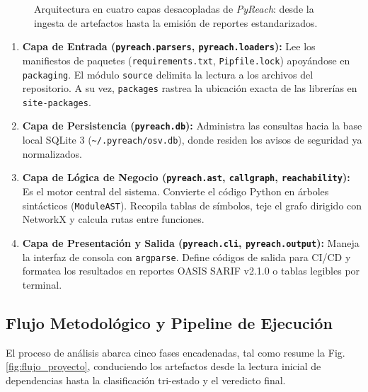 \documentclass[conference]{IEEEtran}
\begin{document}
\begin{figure}[!htbp]
{
}
\caption{Arquitectura en cuatro capas desacopladas de \textit{PyReach}: desde la ingesta de artefactos hasta la emisión de reportes estandarizados.}
\label{fig:arquitectura_capas}
\end{figure}

\begin{enumerate}
    \item \textbf{Capa de Entrada (\texttt{pyreach.parsers}, \texttt{pyreach.loaders}):} Lee los manifiestos de paquetes (\texttt{requirements.txt}, \texttt{Pipfile.lock}) apoyándose en \texttt{packaging}. El módulo \texttt{source} delimita la lectura a los archivos del repositorio. A su vez, \texttt{packages} rastrea la ubicación exacta de las librerías en \texttt{site-packages}.
    \item \textbf{Capa de Persistencia (\texttt{pyreach.db}):} Administra las consultas hacia la base local SQLite 3 (\texttt{\~{}/.pyreach/osv.db}), donde residen los avisos de seguridad ya normalizados.
    \item \textbf{Capa de Lógica de Negocio (\texttt{pyreach.ast}, \texttt{callgraph}, \texttt{reachability}):} Es el motor central del sistema. Convierte el código Python en árboles sintácticos (\texttt{ModuleAST}). Recopila tablas de símbolos, teje el grafo dirigido con NetworkX y calcula rutas entre funciones.
    \item \textbf{Capa de Presentación y Salida (\texttt{pyreach.cli}, \texttt{pyreach.output}):} Maneja la interfaz de consola con \texttt{argparse}. Define códigos de salida para CI/CD y formatea los resultados en reportes OASIS SARIF v2.1.0 o tablas legibles por terminal.
\end{enumerate}

\subsection{Flujo Metodológico y Pipeline de Ejecución}
El proceso de análisis abarca cinco fases encadenadas, tal como resume la Fig. \ref{fig:flujo_proyecto}, conduciendo los artefactos desde la lectura inicial de dependencias hasta la clasificación tri-estado y el veredicto final.
\end{document}
